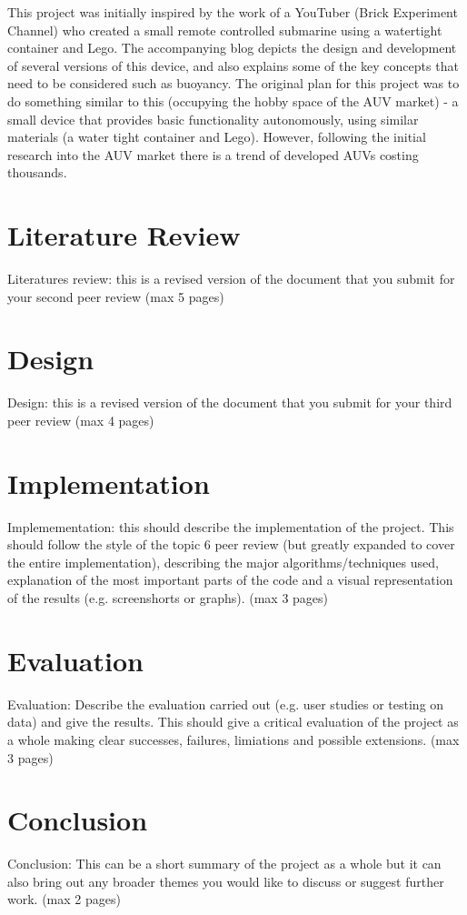 \documentclass[11pt,a4paper,titlepage]{report}
\begin{document}
	This project was initially inspired by the work of a YouTuber (Brick Experiment Channel\cite{BRICK_EXPERIMENT_CHANNEL_PROFILE}) who created a small remote controlled submarine using a watertight container and Lego. The accompanying blog\cite{BRICK_EXPERIMENT_CHANNEL_BLOG} depicts the design and development of several versions of this device, and also explains some of the key concepts that need to be considered such as buoyancy. The original plan for this project was to do something similar to this (occupying the hobby space of the AUV market) - a small device that provides basic functionality autonomously, using similar materials (a water tight container and Lego). However, following the initial research into the AUV market there is a trend of developed AUVs costing thousands\cite{AUV_COST}. 
	
	\chapter*{Literature Review}
	Literatures review: this is a revised version of the document that you submit for your second peer review (max 5 pages)
	
	\chapter*{Design}
	Design: this is a revised version of the document that you submit for your third peer review (max 4 pages)
	
	\chapter*{Implementation}
	Implemementation: this should describe the implementation of the project. This should follow the style of the topic 6 peer review (but greatly expanded to cover the entire implementation), describing the major algorithms/techniques used, explanation of the most important parts of the code and a visual representation of the results (e.g. screenshorts or graphs). (max 3 pages)
	
	\chapter*{Evaluation}
	Evaluation: Describe the evaluation carried out (e.g. user studies or testing on data) and give the results. This should give a critical evaluation of the project as a whole making clear successes, failures, limiations and possible extensions. (max 3 pages)
	
	\chapter*{Conclusion}
	Conclusion: This can be a short summary of the project as a whole but it can also bring out any broader themes you would like to discuss or suggest further work. (max 2 pages)
	
	\printbibliography
\end{document}
